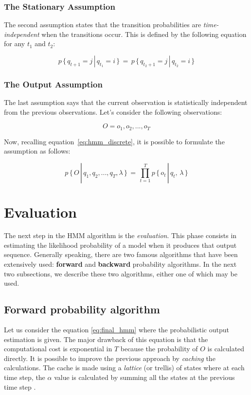 \subsubsection{The Stationary Assumption}
The second assumption states that the transition probabilities are \textit{time-independent} when the transitions occur. This is defined by the following equation for any $t_{1}$ and $t_{2}$:

\begin{equation}
	p \, \{\, q_{t+1} = j \,|\, q_{t_{1}} = i\, \}\, = \,p \,\{\, q_{t_{2}+1} = j \,|\, q_{t_{2}} = i\, \}
\end{equation}

\subsubsection{The Output Assumption}
The last assumption says that the current observation is statistically independent from the previous observations. Let's consider the following observations:

\begin{equation}
	O = o_{1}, o_{2}, ... , o_{T}
\end{equation}

\noindent Now, recalling equation~\ref{eq:hmm_discrete}, it is possible to formulate the assumption as follows:

\begin{equation}
\label{eq:final_hmm}
	p \, \{\, O \, |\, q_{1},q_{2}, ... , q_{T}, \lambda \,\}\, = \, \prod_{t = 1}^{T} p \, \{ \, o_{t} \, | \, q_{t}, \, \lambda \,\}
\end{equation}

\section{Evaluation}
The next step in the HMM algorithm is the \textit{evaluation}. This phase consists in estimating the likelihood probability of a model when it produces that output sequence. Generally speaking, there are two famous algorithms that have been extensively used: \textbf{forward} and \textbf{backward} probability algorithms. In the next two subsections, we describe these two algorithms, either one of which may be used.

\subsection{Forward probability algorithm}
Let us consider the equation \ref{eq:final_hmm} where the probabilistic output estimation is given. The major drawback of this equation is that the computational cost is exponential in $T$ because the probability of $O$ is calculated directly. It is possible to improve the previous approach by \textit{caching} the calculations. The cache is made using a \textit{lattice} (or trellis) of states where at each time step, the $\alpha$ value is calculated by summing all the states at the previous time step \cite{hmm_tutorial}. \\

